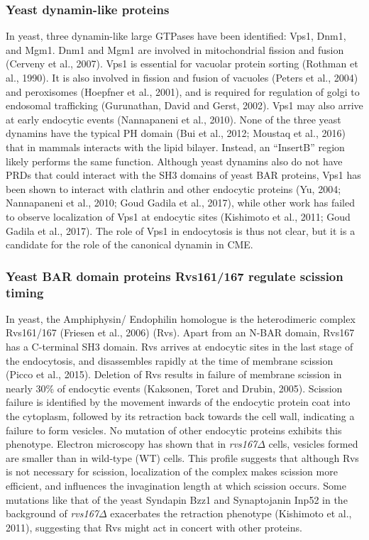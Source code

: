 		\subsubsection{Yeast dynamin-like proteins}
In yeast, three dynamin-like large GTPases have been identified: Vps1, Dnm1, and Mgm1. Dnm1 and Mgm1 are involved in mitochondrial fission and fusion (Cerveny et al., 2007). Vps1 is essential for vacuolar protein sorting (Rothman et al., 1990). It is also involved in fission and fusion of vacuoles (Peters et al., 2004) and peroxisomes (Hoepfner et al., 2001), and is required for regulation of golgi to endosomal trafficking (Gurunathan, David and Gerst, 2002). Vps1 may also arrive at early endocytic events (Nannapaneni et al., 2010). None of the three yeast dynamins have the typical PH domain (Bui et al., 2012; Moustaq et al., 2016) that in mammals interacts with the lipid bilayer. Instead, an “InsertB” region likely performs the same function. Although yeast dynamins also do not have PRDs that could interact with the SH3 domains of yeast BAR proteins, Vps1 has been shown to interact with clathrin and other endocytic proteins (Yu, 2004; Nannapaneni et al., 2010; Goud Gadila et al., 2017), while other work has failed to observe localization of Vps1 at endocytic sites (Kishimoto et al., 2011; Goud Gadila et al., 2017). The role of Vps1 in endocytosis is thus not clear, but it is a candidate for the role of the canonical dynamin in CME.



		\subsubsection{Yeast BAR domain proteins Rvs161/167 regulate scission timing}
In yeast, the Amphiphysin/ Endophilin homologue is the heterodimeric complex Rvs161/167 (Friesen et al., 2006) (Rvs). Apart from an N-BAR domain, Rvs167 has a C-terminal SH3 domain. Rvs arrives at endocytic sites in the last stage of the endocytosis, and disassembles rapidly at the time of membrane scission (Picco et al., 2015). Deletion of Rvs results in failure of membrane scission in nearly 30\% of endocytic events (Kaksonen, Toret and Drubin, 2005). Scission failure is identified by the movement inwards of the endocytic protein coat into the cytoplasm, followed by its retraction back towards the cell wall, indicating a failure to form vesicles. No mutation of other endocytic proteins exhibits this phenotype. Electron microscopy has shown that in \textit{rvs167$\Delta$} cells, vesicles formed are smaller than in wild-type (WT) cells. This profile suggests that although Rvs is not necessary for scission, localization of the complex makes scission more efficient, and influences the invagination length at which scission occurs. Some mutations like that of the yeast Syndapin Bzz1 and Synaptojanin Inp52 in the background of \textit{rvs167$\Delta$} exacerbates the retraction phenotype (Kishimoto et al., 2011), suggesting that Rvs might act in concert with other proteins. 

